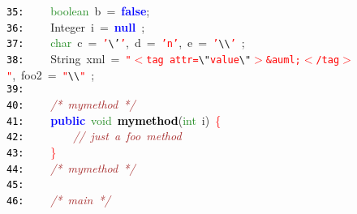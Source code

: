 \documentclass{article}
\begin{document}
\mbox{}\texttt{\textcolor{Black}{35:}} \ \ \ \ \textcolor{ForestGreen}{boolean}\ b\ \textcolor{BrickRed}{=}\ \textbf{\textcolor{Blue}{false}}\textcolor{BrickRed}{;} \\
\mbox{}\texttt{\textcolor{Black}{36:}} \ \ \ \ \textcolor{TealBlue}{Integer}\ i\ \textcolor{BrickRed}{=}\ \textbf{\textcolor{Blue}{null}}\ \textcolor{BrickRed}{;} \\
\mbox{}\texttt{\textcolor{Black}{37:}} \ \ \ \ \textcolor{ForestGreen}{char}\ c\ \textcolor{BrickRed}{=}\ \texttt{\textcolor{Red}{'}}\texttt{\textcolor{CarnationPink}{\textbackslash{}'}}\texttt{\textcolor{Red}{'}}\textcolor{BrickRed}{,}\ d\ \textcolor{BrickRed}{=}\ \texttt{\textcolor{Red}{'n'}}\textcolor{BrickRed}{,}\ e\ \textcolor{BrickRed}{=}\ \texttt{\textcolor{Red}{'}}\texttt{\textcolor{CarnationPink}{\textbackslash{}\textbackslash{}}}\texttt{\textcolor{Red}{'}}\ \textcolor{BrickRed}{;} \\
\mbox{}\texttt{\textcolor{Black}{38:}} \ \ \ \ \textcolor{TealBlue}{String}\ xml\ \textcolor{BrickRed}{=}\ \texttt{\textcolor{Red}{"{}$<$tag\ attr=}}\texttt{\textcolor{CarnationPink}{\textbackslash{}"{}}}\texttt{\textcolor{Red}{value}}\texttt{\textcolor{CarnationPink}{\textbackslash{}"{}}}\texttt{\textcolor{Red}{$>$\&auml;$<$/tag$>$"{}}}\textcolor{BrickRed}{,}\ foo2\ \textcolor{BrickRed}{=}\ \texttt{\textcolor{Red}{"{}}}\texttt{\textcolor{CarnationPink}{\textbackslash{}\textbackslash{}}}\texttt{\textcolor{Red}{"{}}}\ \textcolor{BrickRed}{;} \\
\mbox{}\texttt{\textcolor{Black}{39:}}  \\
\mbox{}\texttt{\textcolor{Black}{40:}} \ \ \ \ \textit{\textcolor{Brown}{/*\ mymethod\ */}} \\
\mbox{}\texttt{\textcolor{Black}{41:}} \ \ \ \ \textbf{\textcolor{Blue}{public}}\ \textcolor{ForestGreen}{void}\ \textbf{\textcolor{Black}{mymethod}}\textcolor{BrickRed}{(}\textcolor{ForestGreen}{int}\ i\textcolor{BrickRed}{)}\ \textcolor{Red}{\{} \\
\mbox{}\texttt{\textcolor{Black}{42:}} \ \ \ \ \ \ \ \ \textit{\textcolor{Brown}{//\ just\ a\ foo\ method}} \\
\mbox{}\texttt{\textcolor{Black}{43:}} \ \ \ \ \textcolor{Red}{\}} \\
\mbox{}\texttt{\textcolor{Black}{44:}} \ \ \ \ \textit{\textcolor{Brown}{/*\ mymethod\ */}} \\
\mbox{}\texttt{\textcolor{Black}{45:}} \ \ \  \\
\mbox{}\texttt{\textcolor{Black}{46:}} \ \ \ \ \textit{\textcolor{Brown}{/*\ main\ */}} \\
\end{document}
